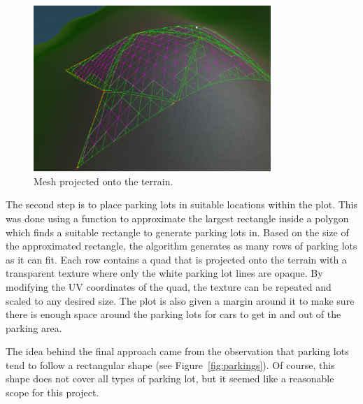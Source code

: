 \begin{figure}[H]
  \centering

  \includegraphics[width=0.8\textwidth]{figure/terrain_projector.png}
  \caption{Mesh projected onto the terrain.}

  \label{fig:methods_parking_terrain_projector}
\end{figure}

The second step is to place parking lots in suitable locations within the plot.
This was done using a function to approximate the largest rectangle inside a polygon which finds a suitable rectangle to generate parking lots in.
Based on the size of the approximated rectangle, the algorithm generates as many rows of parking lots as it can fit.
Each row contains a quad that is projected onto the terrain with a transparent texture where only the white parking lot lines are opaque.
By modifying the UV coordinates of the quad, the texture can be repeated and scaled to any desired size. 
The plot is also given a margin around it to make sure there is enough space around the parking lots for cars to get in and out of the parking area.

The idea behind the final approach came from the observation that parking lots tend to follow a rectangular shape (see Figure~\ref{fig:parkings}).
Of course, this shape does not cover all types of parking lot, but it seemed like a reasonable scope for this project.

